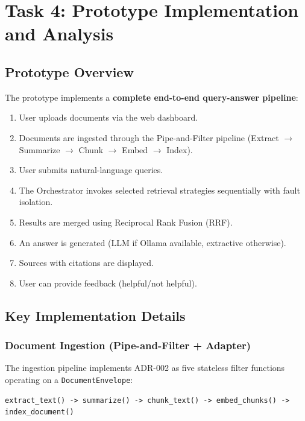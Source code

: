 \documentclass[11pt,a4paper]{article}
\begin{document}
\section{Task 4: Prototype Implementation and Analysis}

\subsection{Prototype Overview}

The prototype implements a \textbf{complete end-to-end query-answer pipeline}:

\begin{enumerate}
    \item User uploads documents via the web dashboard.
    \item Documents are ingested through the Pipe-and-Filter pipeline (Extract $\to$ Summarize $\to$ Chunk $\to$ Embed $\to$ Index).
    \item User submits natural-language queries.
    \item The Orchestrator invokes selected retrieval strategies sequentially with fault isolation.
    \item Results are merged using Reciprocal Rank Fusion (RRF).
    \item An answer is generated (LLM if Ollama available, extractive otherwise).
    \item Sources with citations are displayed.
    \item User can provide feedback (helpful/not helpful).
\end{enumerate}

\subsection{Key Implementation Details}

\subsubsection{Document Ingestion (Pipe-and-Filter + Adapter)}

The ingestion pipeline implements ADR-002 as five stateless filter functions operating on a \texttt{DocumentEnvelope}:

\begin{lstlisting}
extract_text() -> summarize() -> chunk_text() -> embed_chunks() -> index_document()
\end{lstlisting}
\end{document}
